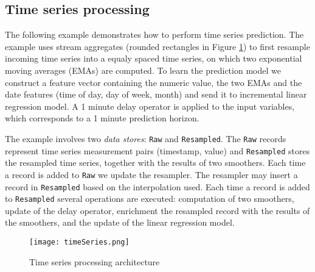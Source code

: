 \documentclass{article} %
\begin{document}
\subsection{Time series processing}

The following example demonstrates how to perform time series prediction. The example uses stream aggregates (rounded rectangles in Figure \ref{fig:timeSeries}) to first resample incoming time series into a equaly spaced time series, on which two exponential moving averages (EMAs) are computed. To learn the prediction model we construct a feature vector containing the numeric value, the two EMAs and the date features (time of day, day of week, month) and send it to incremental linear regression model. A 1 minute delay operator is applied to the input
 variables, which corresponds to a 1 minute prediction horizon.

The example involves two \emph{data stores}: \texttt{Raw} and \texttt{Resampled}. The \texttt{Raw} records represent time series measurement pairs (timestamp, value) and \texttt{Resampled} stores the resampled time series, together with the results of two smoothers. Each time a record is added to \texttt{Raw} we update the resampler. The resampler may insert a record in
\texttt{Resampled} based on the interpolation used. Each time a record is added to \texttt{Resampled} several operations are executed: computation of two smoothers, update of the delay operator, enrichment the resampled record with the results of the smoothers, and the update of the linear regression model. 

      \begin{figure}[h]
      \begin{center}
      \texttt{[image: timeSeries.png]}
      \end{center}
      \caption{Time series processing architecture}\label{fig:timeSeries}
      \end{figure}
\end{document}

